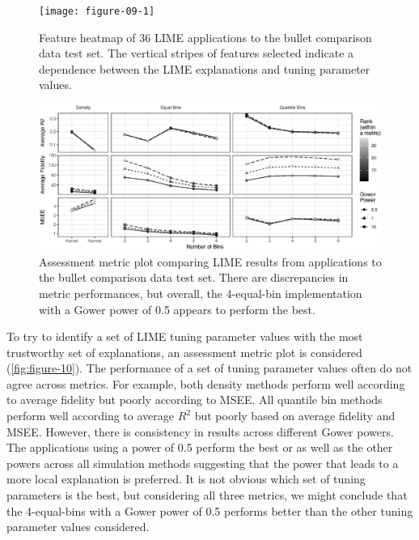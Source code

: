 \documentclass[AMS,STIX2COL]{WileyNJD-v2}\usepackage[]{graphicx}\usepackage[]{color}
\newenvironment{knitrout}{}{} %
\begin{document}
\begin{figure}[!thp]
\begin{knitrout}
\color{fgcolor}

{\centering \texttt{[image: figure-09-1]} 

}



\end{knitrout}
\caption{Feature heatmap of 36 LIME applications to the bullet comparison data test set. The vertical stripes of features selected indicate a dependence between the LIME explanations and tuning parameter values.}
\label{fig:figure-09}

\vspace*{\floatsep}

\begin{knitrout}
\color{fgcolor}

{\centering \includegraphics[width=6.5in]{figure-10-1} 

}



\end{knitrout}
\caption{Assessment metric plot comparing LIME results from applications to the bullet comparison data test set. There are discrepancies in metric performances, but overall, the 4-equal-bin implementation with a Gower power of 0.5 appears to perform the best.}
\label{fig:figure-10}
\end{figure}

To try to identify a set of LIME tuning parameter values with the most trustworthy set of explanations, an assessment metric plot is considered (\autoref{fig:figure-10}). The performance of a set of tuning parameter values often do not agree across metrics. For example, both density methods perform well according to average fidelity but poorly according to MSEE. All quantile bin methods perform well according to average $R^2$ but poorly based on average fidelity and MSEE. However, there is consistency in results across different Gower powers. The applications using a power of 0.5 perform the best or as well as the other powers across all simulation methods suggesting that the power that leads to a more local explanation is preferred. It is not obvious  which set of tuning parameters is the best, but considering all three metrics, we might conclude that the 4-equal-bins with a Gower power of 0.5 performs better than the other tuning parameter values considered.
\end{document}
